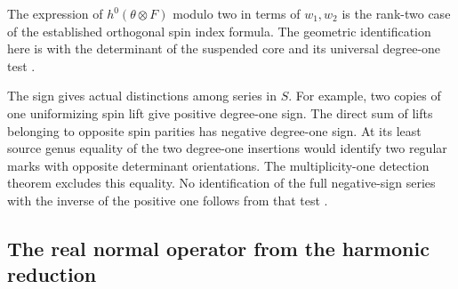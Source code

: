 The expression of \(h^0(\theta\otimes F)\) modulo two in terms of \(w_1,w_2\) is the rank-two case of the established orthogonal spin index formula. The geometric identification here is with the determinant of the suspended core and its universal degree-one test \cite{bspectral}.

The sign gives actual distinctions among series in \(S\). For example, two copies of one uniformizing spin lift give positive degree-one sign. The direct sum of lifts belonging to opposite spin parities has negative degree-one sign. At its least source genus equality of the two degree-one insertions would identify two regular marks with opposite determinant orientations. The multiplicity-one detection theorem \cite[Theorem~5.1]{WueProduct} excludes this equality. No identification of the full negative-sign series with the inverse of the positive one follows from that test \cite{WueProduct}.

\subsection{The real normal operator from the harmonic reduction}


